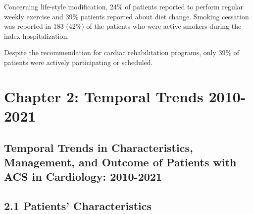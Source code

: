 \documentclass[
]{article}
\begin{document}
Concerning life-style modification, 24\% of patients reported to perform
regular weekly exercise and 39\% patients reported about diet change.
Smoking cessation was reported in 183 (42\%) of the patients who were
active smokers during the index hospitalization.

Despite the recommendation for cardiac rehabilitation programs, only
39\% of patients were actively participating or scheduled. \pagebreak

\section{Chapter 2: Temporal Trends
2010-2021}\label{chapter-2-temporal-trends-2010-2021}

\hfill\break

\subsection{Temporal Trends in Characteristics, Management, and Outcome
of Patients with ACS in Cardiology:
2010-2021}\label{temporal-trends-in-characteristics-management-and-outcome-of-patients-with-acs-in-cardiology-2010-2021}

\hfill\break

\subsection{2.1 Patients'
Characteristics}\label{patients-characteristics}

\hfill\break
\end{document}
